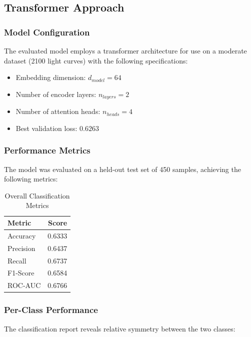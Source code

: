 \documentclass[letterpaper]{article} %
\begin{document}
\subsection{Transformer Approach}
\subsubsection*{Model Configuration}
The evaluated model employs a  transformer architecture for use on a moderate dataset (2100 light curves) with the following specifications:
\begin{itemize}
    \item Embedding dimension: \(d_{model} = 64\)
    \item Number of encoder layers: \(n_{layers} = 2\)
    \item Number of attention heads: \(n_{heads} = 4\)
    \item Best validation loss: \(0.6263\)
\end{itemize}

\subsubsection*{Performance Metrics}

The model was evaluated on a held-out test set of 450 samples, achieving the following metrics:

\begin{table}[h]
\centering
\caption{Overall Classification Metrics}
\begin{tabular}{@{}lr@{}}
\toprule
\textbf{Metric} & \textbf{Score} \\
\midrule
Accuracy        & 0.6333 \\
Precision       & 0.6437 \\
Recall          & 0.6737 \\
F1-Score        & 0.6584 \\
ROC-AUC         & 0.6766 \\
\bottomrule
\end{tabular}
\end{table}

\subsubsection*{Per-Class Performance}

The classification report reveals relative symmetry between the two classes:
\end{document}
